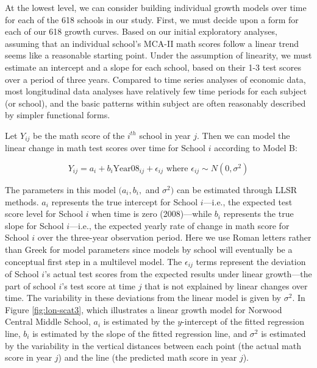 \documentclass[
]{krantz}
\begin{document}
At the lowest level, we can consider building individual growth models over time for each of the 618 schools in our study. First, we must decide upon a form for each of our 618 growth curves. Based on our initial exploratory analyses, assuming that an individual school's MCA-II math scores follow a linear trend seems like a reasonable starting point. Under the assumption of linearity, we must estimate an intercept and a slope for each school, based on their 1-3 test scores over a period of three years. Compared to time series analyses of economic data, most longitudinal data analyses have relatively few time periods for each subject (or school), and the basic patterns within subject are often reasonably described by simpler functional forms.

Let \(Y_{ij}\) be the math score of the \(i^{th}\) school in year \(j\). Then we can model the linear change in math test scores over time for School \(i\) according to Model B:

\begin{equation*}
Y_{ij} = a_{i} + b_{i}\textrm{Year08}_{ij} + \epsilon_{ij} \textrm{ where } \epsilon_{ij} \sim N(0, \sigma^2)
\end{equation*}

The parameters in this model \((a_{i}, b_{i},\) and \(\sigma^2)\) can be estimated through LLSR methods. \(a_{i}\) represents the true intercept for School \(i\)---i.e., the expected test score level for School \(i\) when time is zero (2008)---while \(b_{i}\) represents the true slope for School \(i\)---i.e., the expected yearly rate of change in math score for School \(i\) over the three-year observation period. Here we use Roman letters rather than Greek for model parameters since models by school will eventually be a conceptual first step in a multilevel model. The \(\epsilon_{ij}\) terms represent the deviation of School \(i\)'s actual test scores from the expected results under linear growth---the part of school \(i\)'s test score at time \(j\) that is not explained by linear changes over time. The variability in these deviations from the linear model is given by \(\sigma^2\). In Figure \ref{fig:lon-scat3}, which illustrates a linear growth model for Norwood Central Middle School, \(a_{i}\) is estimated by the \(y\)-intercept of the fitted regression line, \(b_{i}\) is estimated by the slope of the fitted regression line, and \(\sigma^2\) is estimated by the variability in the vertical distances between each point (the actual math score in year \(j\)) and the line (the predicted math score in year \(j\)).
\end{document}
